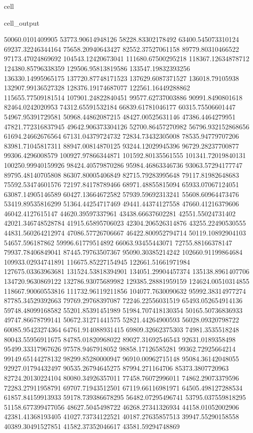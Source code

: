 \documentclass[letterpaper,10pt,english]{jupyterBook}
\begin{document}
\begin{sphinxuseclass}{cell}
\begin{sphinxVerbatimOutput}
\begin{sphinxuseclass}{cell_output}
\begin{sphinxVerbatim}[commandchars=\\\{\}]
50060.0101409905  53773.90614948126  58228.83302178492  63400.545073310124  69237.32246344164  75658.20940643427  82552.37527061158  89779.80310466522  97173.47024869692  104543.12420673041  111680.67500295218  118367.12634878712  124380.85796338359  129506.95813819586  133547.19832393256  136330.14995965175  137720.87748171523  137629.6087371527  136018.79105938  132907.99136527328  128376.19174687077  122561.16449288862  115655.77509181514  107901.24822840451  99577.62737003886  90991.8490801618  82464.0242020953  74312.65591532184  66839.61781046177  60315.75506601447  54967.95391729581  50968.44862087215  48427.00525631146  47386.4464279951  47821.772316837945  49642.906373304126  52700.86457270982  56796.932152868656  61694.24662676564  67131.04379724732  72834.73432305008  78535.94779707206  83981.71045817311  88947.00814870125  93244.12029945396  96729.28237700877  99306.4296008579  100927.97866344871  101592.80135561555  101341.72019840131  100250.99940159926  98424.40579870286  95984.46863346736  93063.57294177747  89795.48140705808  86307.80005406849  82715.79283995648  79117.81982648683  75592.53474601576  72197.84178789466  68971.48855815094  65933.07067124051  63087.14905146589  60427.13664672582  57939.59692313241  55608.60964473476  53419.89535816299  51364.44254717469  49441.44374127558  47660.41216379606  46042.4127615147  44620.39597337961  43438.66637602281  42551.55024731402  42021.346748528784  41915.65895706023  42304.206526314876  43255.22490530555  44831.560264212974  47086.57726706667  
46422.800952794714  50119.10892904103  54657.596187862  59996.61779514892  66063.93455443071  72755.88166378147  79937.78406849041  87445.79763507367  95090.30385214242  102660.91199864684  109933.02934741891  116675.85227154945  122661.51661971984  127675.03363963681  131524.53818394901  134051.29904457374  135138.8961407706  134720.9630869122  132786.93075689982  129385.28881959159  124624.00510314855  118667.90060553816  111732.96119211856  104077.7630090632  95992.38314977274  87785.34529392663  79769.29768397087  72246.22556031519  65493.052654914136  59748.48099168582  55201.85391451989  51984.707418130354  50165.50736836933  49747.86678799141  50672.31271441575  52821.44264900593  56028.09320798722  60085.95423274364  64761.914088931415  69809.32662375303  74981.3535518248  80043.55956911675  84785.01820968022  89027.31692546543  92631.0189358498  95499.33317967626  97578.9467918052  98858.17126585281  99362.72925664214  99149.65144278132  98299.85280000947  96910.00962715148  95084.36142048055  92927.01794432497  90535.26794645275  87994.271164706  85373.3807720963  82724.20130224104  80080.34926357011  77458.76072996011  74862.29073379596  72283.27911958791  69707.71943512501  67119.66116981971  64505.498127288534  61857.84159913933  59178.739386678295  56482.07295496741  53795.037559818295  51158.677399477056  48627.5045498722  46268.27341326934  44158.01052002906  42381.41368193405  41027.73734122521  40187.27635857513  39947.55290158558  40389.30491527851  41582.37352046617  43581.59294748869  

\end{sphinxVerbatim}
\end{sphinxuseclass}
\end{sphinxVerbatimOutput}
\end{sphinxuseclass}
\end{document}
